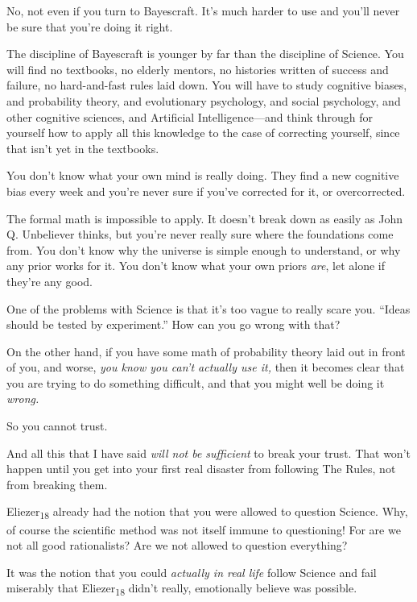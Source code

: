 {
 No, not even if you turn to Bayescraft. It's much
harder to use and you'll never be sure that
you're doing it right.}

{
 The discipline of Bayescraft is younger by far than the discipline
of Science. You will find no textbooks, no elderly mentors, no
histories written of success and failure, no hard-and-fast rules laid
down. You will have to study cognitive biases, and probability theory,
and evolutionary psychology, and social psychology, and other cognitive
sciences, and Artificial Intelligence---and think through for yourself
how to apply all this knowledge to the case of correcting yourself,
since that isn't yet in the textbooks.}

{
 You don't know what your own mind is really doing.
They find a new cognitive bias every week and you're
never sure if you've corrected for it, or
overcorrected.}

{
 The formal math is impossible to apply. It doesn't
break down as easily as John Q. Unbeliever thinks, but
you're never really sure where the foundations come
from. You don't know why the universe is simple enough
to understand, or why any prior works for it. You don't
know what your own priors \textit{are}, let alone if
they're any good.}

{
 One of the problems with Science is that it's too
vague to really scare you. ``Ideas should be tested by
experiment.'' How can you go wrong with that?}

{
 On the other hand, if you have some math of probability theory
laid out in front of you, and worse, \textit{you know you
can't actually use it,} then it becomes clear that you
are trying to do something difficult, and that you might well be doing
it \textit{wrong.}}

{
 So you cannot trust.}

{
 And all this that I have said \textit{will not be sufficient} to
break your trust. That won't happen until you get into
your first real disaster from following The Rules, not from breaking
them.}

{
 Eliezer\textsubscript{18} already had the notion that you were
allowed to question Science. Why, of course the scientific method was
not itself immune to questioning! For are we not all good rationalists?
Are we not allowed to question everything?}

{
 It was the notion that you could \textit{actually in real life}
follow Science and fail miserably that Eliezer\textsubscript{18}
didn't really, emotionally believe was possible.}

